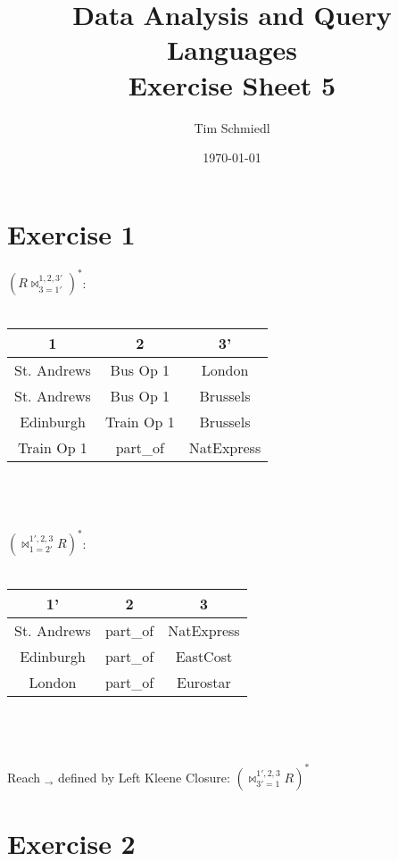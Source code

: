 \documentclass{article}
\begin{document}
\title{Data Analysis and Query Languages \\
 Exercise Sheet 5}
\date{\today}
\author{Tim Schmiedl} 
\maketitle

\section*{Exercise 1}

$(R\bowtie^{1,2,3'}_{3=1'})^*$:\\
\\
\begin{tabular}{c|c|c}
1 & 2 & 3'\\
\hline
St. Andrews & Bus Op 1 & London\\
\hline
St. Andrews & Bus Op 1 & Brussels\\
\hline
Edinburgh & Train Op 1 & Brussels\\
\hline
Train Op 1 & part\_of & NatExpress
\end{tabular}\\
\\
\\
$(\bowtie^{1',2,3}_{1=2'}R)^*$:\\
\\
\begin{tabular}{c|c|c}
1' & 2 & 3\\
\hline
St. Andrews & part\_of & NatExpress\\
\hline
Edinburgh & part\_of & EastCost\\
\hline
London & part\_of & Eurostar\\
\end{tabular}\\
\\
\\
Reach $_{\to}$ defined by Left Kleene Closure: $(\bowtie^{1',2,3}_{3'=1}R)^*$\\

\vspace{2cm}
\section*{Exercise 2}
\end{document}

